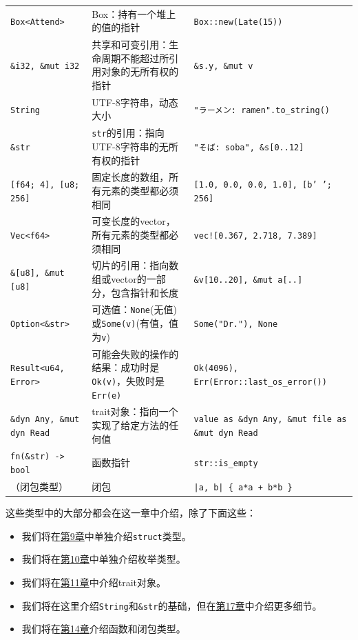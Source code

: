 \begin{longtable}{p{}p{}p{}}
    \texttt{Box<Attend>}                             & Box：持有一个堆上的值的指针   & \texttt{Box::new(Late(15))} \\
    \texttt{\&i32, \&mut i32}                       & 共享和可变引用：生命周期不能超过所引用对象的无所有权的指针 & \texttt{\&s.y, \&mut v} \\
    \rowcolor{tablecolor}
    \texttt{String}                                 & UTF-8字符串，动态大小         & \texttt{"ラーメン: ramen"\newline.to\_string()} \\
    \texttt{\&str}                                  & \texttt{str}的引用：指向UTF-8字符串的无所有权的指针 & \texttt{"そば: soba", \&s[0..12]} \\
    \rowcolor{tablecolor}
    \texttt{[f64; 4], [u8; 256]}                    & 固定长度的数组，所有元素的类型都必须相同   & \texttt{[1.0, 0.0, 0.0, 1.0], [b' '; 256]} \\
    \texttt{Vec<f64>}                               & 可变长度的vector，所有元素的类型都必须相同 & \texttt{vec![0.367, 2.718, 7.389]} \\
    \rowcolor{tablecolor}
    \texttt{\&[u8], \&mut [u8]}                     & 切片的引用：指向数组或vector的一部分，包含指针和长度 & \texttt{\&v[10..20], \&mut a[..]} \\
    \texttt{Option<\&str>}      & 可选值：\texttt{None}(无值)或\texttt{Some(v)}(有值，值为\texttt{v})   & \texttt{Some("Dr."), None} \\
    \rowcolor{tablecolor}
    \texttt{Result<u64, Error>} & 可能会失败的操作的结果：成功时是\texttt{Ok(v)}，失败时是\texttt{Err(e)} & \texttt{Ok(4096), Err(Error::last\_os\_error())} \\
    \texttt{\&dyn Any, \&mut dyn Read}  & trait对象：指向一个实现了给定方法的任何值 & \texttt{value as \&dyn Any, \&mut file as \&mut dyn Read} \\
    \rowcolor{tablecolor}
    \texttt{fn(\&str) -> bool}          & 函数指针      & \texttt{str::is\_empty}           \\
    （闭包类型）                         & 闭包         & \texttt{|a, b| \{ a*a + b*b \}}    \\
\end{longtable}

这些类型中的大部分都会在这一章中介绍，除了下面这些：
\begin{itemize}
    \item 我们将在\hyperref[ch09]{第9章}中单独介绍\texttt{struct}类型。
    \item 我们将在\hyperref[ch10]{第10章}中单独介绍枚举类型。
    \item 我们将在\hyperref[ch11]{第11章}中介绍trait对象。
    \item 我们将在这里介绍\texttt{String}和\texttt{\&str}的基础，但在\hyperref[ch17]{第17章}中介绍更多细节。
    \item 我们将在\hyperref[ch14]{第14章}介绍函数和闭包类型。
\end{itemize}

